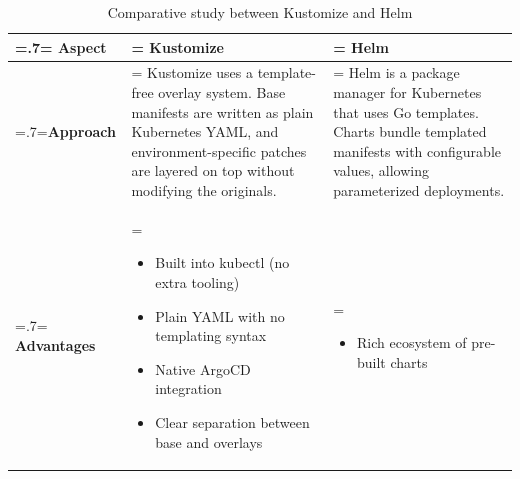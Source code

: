 \begin{table}[H]
    \renewcommand{\arraystretch}{1.5}%
    \caption{Comparative study between Kustomize and Helm}
    \centering
    \medskip
    \begin{tabularx}{1\textwidth} {
            | >{\hsize=.7\hsize\linewidth=\hsize\centering\arraybackslash}X
            | >{\hsize=1.15\hsize\linewidth=\hsize\justifying\arraybackslash}X
            | >{\hsize=1.15\hsize\linewidth=\hsize\justifying\arraybackslash}X |}
        \hline
        \rowcolor{primary} \textbf {Aspect} & \textbf{Kustomize}                                                                                                                                                                                                                     & \textbf{Helm}                                                                                                                                                                                                                                           \\
        \hline
        \textbf {Approach}                  & \noindent Kustomize uses a template-free overlay system. Base manifests are written as plain Kubernetes YAML, and environment-specific patches are layered on top without modifying the originals.                                                                                                             & \noindent Helm is a package manager for Kubernetes that uses Go templates. Charts bundle templated manifests with configurable values, allowing parameterized deployments.                                                                                                                                                                                   \\
        \hline
        \textbf {Advantages}                & \begin{itemize}[leftmargin=*, topsep=0pt, itemsep=1pt, parsep=2pt]
            \item Built into kubectl (no extra tooling)
            \item Plain YAML with no templating syntax
            \item Native ArgoCD integration
            \item Clear separation between base and overlays
        \end{itemize} & \begin{itemize}[leftmargin=*, topsep=0pt, itemsep=1pt, parsep=2pt]
            \item Rich ecosystem of pre-built charts

\end{itemize}
\end{tabularx}
\end{table}
